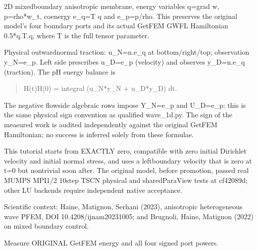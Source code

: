 \documentclass[letterpaper,10pt,english]{sphinxmanual}
\begin{document}
\sphinxAtStartPar
2D mixed\sphinxhyphen{}boundary anisotropic membrane, energy variables q=grad w,
p=rho*w\_t, coenergy e\_q=T q and e\_p=p/rho. This preserves the
original model’s four boundary ports and its actual GetFEM GWFL
Hamiltonian 0.5*q.T.q, where T is the full tensor parameter.

\sphinxAtStartPar
Physical outward\sphinxhyphen{}normal traction: u\_N=n.e\_q at bottom/right/top;
observation y\_N=e\_p. Left side prescribes u\_D=e\_p (velocity) and
observes y\_D=n.e\_q (traction). The pH energy balance is
\begin{quote}

\sphinxAtStartPar
H(t)\sphinxhyphen{}H(0) = integral (u\_N*y\_N + u\_D*y\_D) dt.
\end{quote}

\sphinxAtStartPar
The negative flow\sphinxhyphen{}side algebraic rows impose Y\_N=e\_p and U\_D=e\_p:
this is the same physical sign convention as qualified wave\_1d.py.
The  sign of the measured work is audited independently
against the original GetFEM Hamiltonian; no success is inferred
solely from these formulae.

\sphinxAtStartPar
This tutorial starts from EXACTLY zero, compatible with zero
initial Dirichlet velocity and initial normal stress, and uses
a left\sphinxhyphen{}boundary velocity that is zero at t=0 but nontrivial soon
after. The original model, before promotion, passed real MUMPS MPI1/2
10\sphinxhyphen{}step TSCN physical and shared\sphinxhyphen{}ParaView tests at cf42089d;
other LU backends require independent native acceptance.

\sphinxAtStartPar
Scientific context: Haine, Matignon, Serhani (2023), anisotropic
heterogeneous wave PFEM, DOI 10.4208/ijnam2023\sphinxhyphen{}1005; and
Brugnoli, Haine, Matignon (2022) on mixed boundary control.


\begin{fulllineitems}

\pysigstartsignatures
\pysiglinewithargsret
{}
{}
{}
\pysigstopsignatures
\end{fulllineitems}



\begin{fulllineitems}

\pysigstartsignatures
\pysiglinewithargsret
{}
{}
{}
\pysigstopsignatures
\sphinxAtStartPar
Measure ORIGINAL GetFEM energy and all four signed port powers.

\end{fulllineitems}
\end{document}
